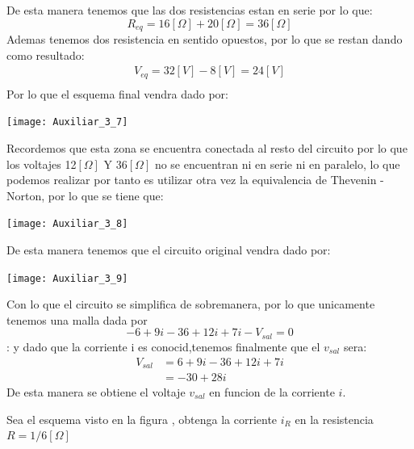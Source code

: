 \documentclass[
  11pt,
  letterpaper,
   addpoints,
   answers
  ]{exam}
\begin{document}
\begin{questions}
\begin{solution}
\begin{center}
        \end{center}
        De esta manera tenemos que las dos resistencias estan en serie por lo que:
        \begin{equation}
            R_{eq} = 16[\Omega] + 20[\Omega] = 36[\Omega]
        \end{equation} 
        Ademas tenemos dos resistencia en sentido opuestos, por lo que se restan dando como resultado:
        \begin{align}
            V_{eq} = 32[V] - 8[V] = 24[V]\\
        \end{align}
        Por lo que el esquema final vendra dado por:
        \begin{center}
            \texttt{[image: Auxiliar\_3\_7]}
        \end{center}
        Recordemos que esta zona se encuentra conectada al resto del circuito por lo que los voltajes 12$[\Omega]$ Y 36$[\Omega]$ no se encuentran ni en serie ni en paralelo, lo que podemos realizar por tanto es utilizar otra vez la equivalencia de Thevenin - Norton, por lo que se tiene que:
        \begin{center}
            \texttt{[image: Auxiliar\_3\_8]}
        \end{center}
        De esta manera tenemos que el circuito original vendra dado por:
        \begin{center}
            \texttt{[image: Auxiliar\_3\_9]}
        \end{center}
        Con lo que el circuito se simplifica de sobremanera, por lo que unicamente tenemos una malla dada por
        \begin{equation}
        -6 +9i - 36 + 12i + 7i - V_{sal}=0 
    \end{equation}:
    y dado que la corriente i es conocid,tenemos finalmente que el $v_{sal}$ sera:
        \begin{align}
            V_{sal} &= 6 + 9i - 36 + 12i + 7i \\
            &= -30 + 28i
        \end{align}
        De esta manera se obtiene el voltaje $v_{sal}$ en funcion de la corriente $i$.
    \end{solution}
    \question  Sea el esquema visto en la figura  , obtenga la corriente $i_{R}$ en la resistencia $R= 1/6 [\Omega]$ 

\end{questions}
\end{document}
